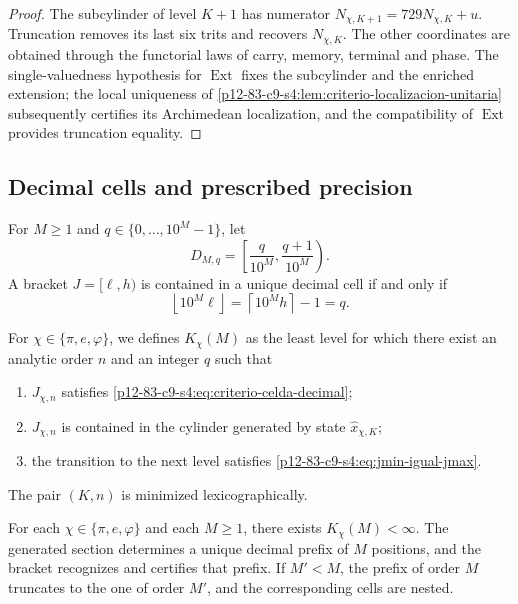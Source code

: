 \begin{proof}
The subcylinder of level \(K+1\) has numerator
\(N_{\chi,K+1}=729N_{\chi,K}+u\). Truncation removes its last six
trits and recovers \(N_{\chi,K}\). The other coordinates are obtained through the
functorial laws of carry, memory, terminal and phase. The single-valuedness
hypothesis for \(\operatorname{Ext}\) fixes the subcylinder and the enriched
extension; the local uniqueness of
\cref{p12-83-c9-s4:lem:criterio-localizacion-unitaria} subsequently certifies its
Archimedean localization, and the compatibility of \(\operatorname{Ext}\)
provides truncation equality.
\end{proof}

\subsection{Decimal cells and prescribed precision}

For \(M\geq1\) and \(q\in\{0,\ldots,10^M-1\}\), let
\[
 D_{M,q}=
 \left[
 \frac{q}{10^M},
 \frac{q+1}{10^M}
 \right).
\]
A bracket \(J=[\ell,h)\) is contained in a unique decimal cell if
and only if
\begin{equation}
 \boxed{
 \left\lfloor10^M\ell\right\rfloor
 =\left\lceil10^Mh\right\rceil-1=q.}
 \label{p12-83-c9-s4:eq:criterio-celda-decimal}
\end{equation}

\begin{definition}
For \(\chi\in\{\pi,e,\varphi\}\), we defines \(K_\chi(M)\) as the least
level for which there exist an analytic order \(n\) and an integer \(q\) such
that
\begin{enumerate}
 \item \(J_{\chi,n}\) satisfies
       \eqref{p12-83-c9-s4:eq:criterio-celda-decimal};
 \item \(J_{\chi,n}\) is contained in the cylinder generated by
       state \(\widehat x_{\chi,K}\);
 \item the transition to the next level satisfies
       \eqref{p12-83-c9-s4:eq:jmin-igual-jmax}.
\end{enumerate}
The pair \((K,n)\) is minimized lexicographically.
\end{definition}

\begin{theorem}
\label{p12-83-c9-s4:thm:precision-decimal-arbitraria}
For each \(\chi\in\{\pi,e,\varphi\}\) and each \(M\geq1\), there exists
\(K_\chi(M)<\infty\). The generated section determines a unique decimal prefix
of \(M\) positions, and the bracket recognizes and certifies that prefix. If
\(M'<M\), the prefix of order \(M\) truncates to the one of
order \(M'\), and the corresponding cells are nested.
\end{theorem}

